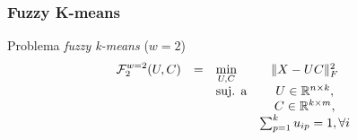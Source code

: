\documentclass[10pt]{beamer}
\DeclarePairedDelimiter\norm{\lVert}{\rVert}
\begin{document}



\begin{frame}
  \frametitle{Fuzzy K-means}

  \begin{block}{Problema \textit{fuzzy k-means} ($w = 2$)}
    \begin{equation}
      \begin{array}{lclcl}
          \displaystyle \mathcal{F}^{w=2}_2(U, C) & = & \displaystyle \min_{U, C}    &  \norm{X - UC}^{2}_F \\
                                            &   & \text{suj. a}                & U \in \mathbb{R}^{n \times k}, \\
                                            &   &                              & C \in \mathbb{R}^{k \times m}, \\
                                            &   &                              & \sum_{p=1}^{k} u_{ip} = 1, \forall i
      \end{array} \nonumber
  \end{equation}
  \end{block}

\end{frame}

\end{document}
